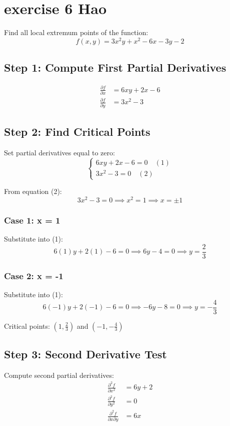 \documentclass{article}
\begin{document}
\section{exercise 6 Hao}

Find all local extremum points of the function:
\[ f(x,y) = 3x^{2}y + x^{2} - 6x - 3y - 2 \]

\subsection*{Step 1: Compute First Partial Derivatives}
\begin{align*}
\frac{\partial f}{\partial x} &= 6xy + 2x - 6 \\
\frac{\partial f}{\partial y} &= 3x^{2} - 3
\end{align*}

\subsection*{Step 2: Find Critical Points}
Set partial derivatives equal to zero:
\[
\begin{cases}
6xy + 2x - 6 = 0 \quad (1) \\
3x^{2} - 3 = 0 \quad (2)
\end{cases}
\]

From equation (2):
\[ 3x^{2} - 3 = 0 \implies x^{2} = 1 \implies x = \pm 1 \]

\subsubsection*{Case 1: x = 1}
Substitute into (1):
\[ 6(1)y + 2(1) - 6 = 0 \implies 6y - 4 = 0 \implies y = \frac{2}{3} \]

\subsubsection*{Case 2: x = -1}
Substitute into (1):
\[ 6(-1)y + 2(-1) - 6 = 0 \implies -6y - 8 = 0 \implies y = -\frac{4}{3} \]

Critical points: $(1, \frac{2}{3})$ and $(-1, -\frac{4}{3})$

\subsection*{Step 3: Second Derivative Test}
Compute second partial derivatives:
\begin{align*}
\frac{\partial^{2} f}{\partial x^{2}} &= 6y + 2 \\
\frac{\partial^{2} f}{\partial y^{2}} &= 0 \\
\frac{\partial^{2} f}{\partial x \partial y} &= 6x
\end{align*}
\end{document}
